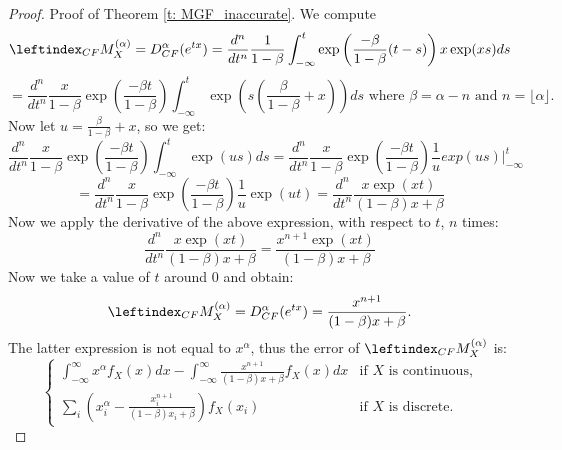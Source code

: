 \begin{proof}
    Proof of Theorem \ref{t: MGF_inaccurate}.
    We compute \[\leftindex_{CF}{M}_X^{(\alpha)} = D^\alpha_{CF}(e^{tx}) = \frac{d^n}{dt^n}\frac{1}{1 - \beta}  \int_{-\infty}^{t} \exp\left(\frac{-\beta}{1 - \beta}(t - s)\right) x \exp(xs) ds\]
    \[= \frac{d^n}{dt^n}\frac{x}{1 - \beta} \exp\left(\frac{-\beta t}{1 - \beta}\right) \int_{-\infty}^{t} \exp\left(s\left(\frac{\beta }{1 - \beta} + x \right)\right) ds  \text{ where } \beta = \alpha - n \text{ and } n = \lfloor \alpha \rfloor.\]
    Now let \( \displaystyle u = \frac{\beta}{1 - \beta} + x\), so we get:
    \[\frac{d^n}{dt^n}\frac{x}{1 - \beta} \exp\left(\frac{-\beta t}{1 - \beta}\right) \int_{-\infty}^{t} \exp(us) ds = \frac{d^n}{dt^n}\frac{x}{1 - \beta} \exp\left(\frac{-\beta t}{1 - \beta}\right) \frac{1}{u} exp(us)\Big|_{-\infty}^{t}\]
    \[= \frac{d^n}{dt^n} \frac{x}{1 - \beta} \exp\left(\frac{-\beta t}{1 - \beta}\right)  \frac{1}{u}  \exp(u t) = \frac{d^n}{dt^n}\frac{x \exp(xt)}{(1 - \beta)x + \beta}\]
    Now we apply the derivative of the above expression, with respect to \(t\), \(n\) times:
    \[\frac{d^n}{d t^n} \frac{x \exp(xt)}{(1 - \beta)x + \beta} = \frac{x^{n+1} \exp(xt)}{(1 - \beta)x + \beta}\]
    Now we take a value of \(t\) around 0 and obtain:
    \[\leftindex_{CF}{M}_X^{(\alpha)} = D^\alpha_{CF}(e^{tx}) = \frac{x^{n+1} }{(1 - \beta)x + \beta}.\]
    The latter expression is not equal to \(x^\alpha\), thus the error of \(\leftindex_{CF}{M}_X^{(\alpha)}\) is:
    \[
    \begin{cases} 
    \displaystyle \int_{-\infty}^{\infty} x^\alpha  f_X(x) dx -  \displaystyle \int_{-\infty}^{\infty}  \frac{x^{n+1} }{(1 - \beta)x + \beta} f_X(x) dx & \text{if } X \text{ is continuous,} \\ 
    \displaystyle \sum_{i} \left(x_i^\alpha -  \frac{x_i^{n+1} }{(1 - \beta)x_i + \beta}\right) f_X(x_i) & \text{if } X \text{ is discrete.} 
\end{cases}\]

\end{proof}

\clearpage

